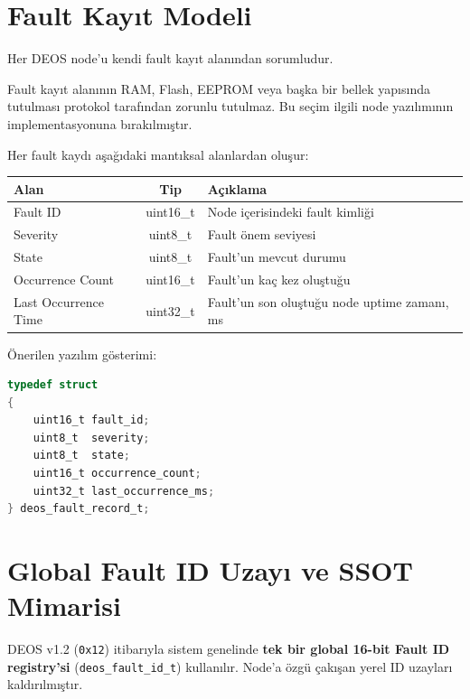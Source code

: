 \documentclass[a4paper,11pt]{article}
\newcommand{\hex}[1]{\texttt{0x#1}}
\newcommand{\code}[1]{\texttt{#1}}
\begin{document}
\section{Fault Kayıt Modeli}

Her DEOS node'u kendi fault kayıt alanından sorumludur.

Fault kayıt alanının RAM, Flash, EEPROM veya başka bir bellek yapısında
tutulması protokol tarafından zorunlu tutulmaz.
Bu seçim ilgili node yazılımının implementasyonuna bırakılmıştır.

Her fault kaydı aşağıdaki mantıksal alanlardan oluşur:

\begin{center}
\begin{tabular}{l c l}
\toprule
\textbf{Alan} & \textbf{Tip} & \textbf{Açıklama} \\
\midrule
Fault ID &
uint16\_t &
Node içerisindeki fault kimliği \\

Severity &
uint8\_t &
Fault önem seviyesi \\

State &
uint8\_t &
Fault'un mevcut durumu \\

Occurrence Count &
uint16\_t &
Fault'un kaç kez oluştuğu \\

Last Occurrence Time &
uint32\_t &
Fault'un son oluştuğu node uptime zamanı, ms \\
\bottomrule
\end{tabular}
\end{center}

Önerilen yazılım gösterimi:

\begin{lstlisting}[language=C]
typedef struct
{
    uint16_t fault_id;
    uint8_t  severity;
    uint8_t  state;
    uint16_t occurrence_count;
    uint32_t last_occurrence_ms;
} deos_fault_record_t;
\end{lstlisting}

\section{Global Fault ID Uzayı ve SSOT Mimarisi}

DEOS v1.2 (\hex{12}) itibarıyla sistem genelinde \textbf{tek bir global 16-bit Fault ID registry'si} (\code{deos\_fault\_id\_t}) kullanılır. Node'a özgü çakışan yerel ID uzayları kaldırılmıştır.
\end{document}
